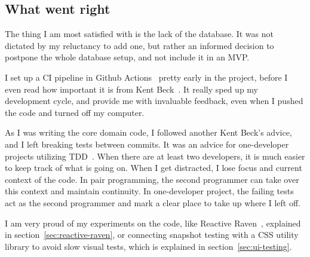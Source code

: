 \subsection{What went right}\label{sec:what-went-right}

The thing I am most satisfied with
is the lack of the database.
It was not dictated by my reluctancy to add one,
but rather an informed decision
to postpone the whole database setup,
and not include it in an \ac{MVP}.

I set up a \ac{CI} pipeline
in Github Actions~\cite{github_inc_github_2022-1}
pretty early in the project,
before I even read how important it is
from Kent Beck~\cite{beck_extreme_2004}.
It really sped up my development cycle,
and provide me with invaluable feedback,
even when I pushed the code and turned off my computer.

As I was writing the core domain code,
I followed another Kent Beck's advice,
and I left breaking tests between commits.
It was an advice for one-developer projects
utilizing \ac{TDD}~\cite{beck_test-driven_2002}.
When there are at least two developers,
it is much easier to keep track of what is going on.
When I get distracted,
I lose focus and current context of the code.
In pair programming,
the second programmer can take over this context
and maintain continuity.
In one-developer project,
the failing tests act as the second programmer
and mark a clear place to take up where I left off.

I am very proud of my experiments
on the code,
like Reactive Raven~\cite{sewera_reactive_2022},
explained in section~\ref{sec:reactive-raven},
or connecting snapshot testing
with a \ac{CSS} utility library
to avoid slow visual tests,
which is explained in section~\ref{sec:ui-testing}.
